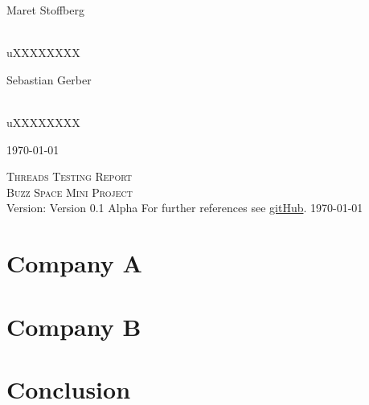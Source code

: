 \documentclass[a4paper,12pt]{report}
\begin{document}
\begin{titlepage}
\begin{center}
\begin{minipage}{0.4\textwidth}
\end{minipage}
\begin{minipage}{0.4\textwidth}
\begin{flushleft} \large
Maret {Stoffberg}
\end{flushleft}
\end{minipage}
\begin{minipage}{0.4\textwidth}
\begin{flushright} \large
\emph{} \\
uXXXXXXXX
\end{flushright}
\end{minipage}
\begin{minipage}{0.4\textwidth}
\begin{flushleft} \large
Sebastian {Gerber}
\end{flushleft}
\end{minipage}
\begin{minipage}{0.4\textwidth}
\begin{flushright} \large
\emph{} \\
uXXXXXXXX
\end{flushright}
\end{minipage}
\vfill
{\large \today}
\end{center}
\end{titlepage}
%

\renewcommand{\thesection}{\arabic{section}}
\newpage
\begin{center}
\textsc{\LARGE Threads Testing Report}\\[1.5cm]
\textsc{\Large Buzz Space Mini Project}\\[0.5cm]
Version: Version 0.1 Alpha 
For further references see \href{https://github.com/thepickpocket/ThreadsTesting}{gitHub}.
\today
\end{center}

\newpage
\tableofcontents
\pagebreak

\section{Company A}



\section{Company B}



\section{Conclusion}

\end{document}
